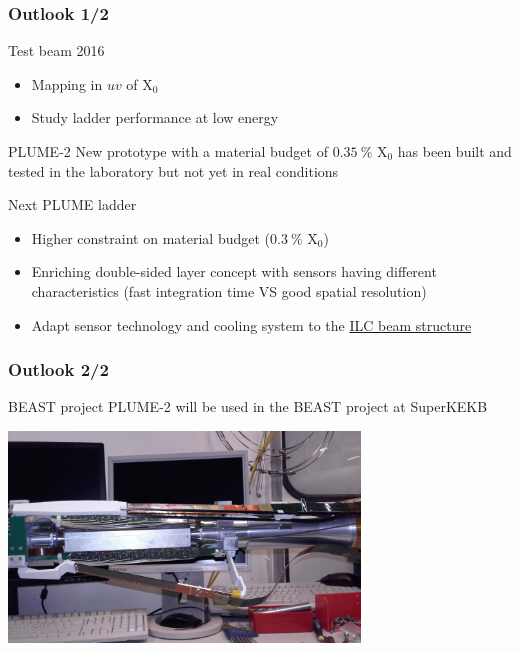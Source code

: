 \documentclass{beamer}
\begin{document}
\begin{frame}
  \frametitle{Outlook 1/2}

  \vspace{-0.25cm}
  \begin{block}{Test beam 2016}
    \begin{itemize}
      \item Mapping in $uv$ of X$_0$
      \item Study ladder performance at low energy
    \end{itemize}
  \end{block}

  \vspace{-0.15cm}
  \begin{block}{PLUME-2}
    New prototype with a material budget of $0.35~\%$ X$_0$ has been built and tested in the laboratory but not yet in real conditions
  \end{block}

  \vspace{-0.15cm}
  \begin{block}{Next PLUME ladder}
    \begin{itemize}
      \item Higher constraint on material budget ($0.3~\%$ X$_0$)
      \item Enriching double-sided layer concept with sensors having different characteristics (fast integration time VS good spatial resolution)
      \item Adapt sensor technology and cooling system to the \hyperlink{power-pulsing}{ILC beam structure}
    \end{itemize}
  \end{block}


\end{frame}

\begin{frame}
  \frametitle{Outlook 2/2}

    \begin{block}{BEAST project}
    PLUME-2 will be used in the BEAST project at SuperKEKB
    \vspace{-0.2cm}
    \begin{center}
      \includegraphics[width = 0.7\textwidth]{Pictures/plumeInTableDesySetup.jpg}
    \end{center}
  \end{block}
\end{frame}
\end{document}
